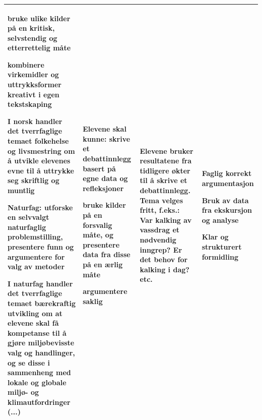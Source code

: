 \documentclass[a4paper,12pt]{article}
\begin{document}
\begin{landscape}
\begin{tabular}{|p{5cm}|p{6cm}|p{8cm}|p{6cm}|}
bruke ulike kilder på en kritisk, selvstendig og etterrettelig måte\newline

kombinere virkemidler og uttrykksformer kreativt i egen tekstskaping\newline

I norsk handler det tverrfaglige temaet folkehelse og livsmestring om å utvikle elevenes evne til å uttrykke seg skriftlig og muntlig\newline

Naturfag: utforske en selvvalgt naturfaglig problemstilling, presentere funn og argumentere for valg av metoder\newline

I naturfag handler det tverrfaglige temaet bærekraftig utvikling om at elevene skal få kompetanse til å gjøre miljøbevisste valg og handlinger, og se disse i sammenheng med lokale og globale miljø- og klimautfordringer (...)
& 
Elevene skal kunne: skrive et debattinnlegg basert på egne data og refleksjoner\newline

bruke kilder på en forsvalig måte, og presentere data fra disse på en ærlig måte\newline

argumentere saklig 
& 
Elevene bruker resultatene fra tidligere økter til å skrive et debattinnlegg. Tema velges fritt, f.eks.: Var kalking av vassdrag et nødvendig inngrep? Er det behov for kalking i dag? etc.
& 
Faglig korrekt argumentasjon\newline

Bruk av data fra ekskursjon og analyse\newline

Klar og strukturert formidling
\\
\hline
\end{tabular}

\end{landscape}
\end{document}
